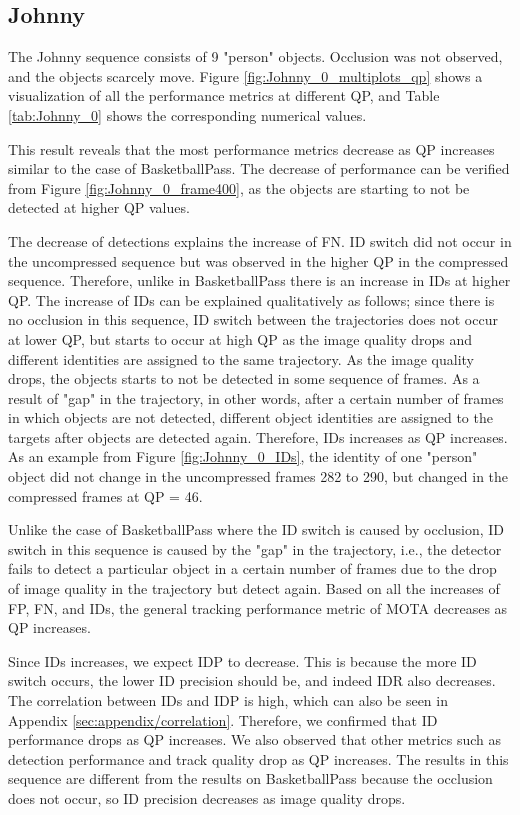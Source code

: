 \subsection{Johnny}
The Johnny sequence consists of 9 "person" objects. Occlusion was not observed, and the objects scarcely move. Figure \ref{fig:Johnny_0_multiplots_qp} shows a visualization of all the performance metrics at different QP, and Table \ref{tab:Johnny_0} shows the corresponding numerical values.


This result reveals that the most performance metrics decrease as QP increases similar to the case of BasketballPass. The decrease of performance can be verified from Figure \ref{fig:Johnny_0_frame400}, as the objects are starting to not be detected at higher QP values.

The decrease of detections explains the increase of FN. ID switch did not occur in the uncompressed sequence but was observed in the higher QP in the compressed sequence. Therefore, unlike in BasketballPass there is an increase in IDs at higher QP. The increase of IDs can be explained qualitatively as follows; since there is no occlusion in this sequence, ID switch between the trajectories does not occur at lower QP, but starts to occur at high QP as the image quality drops and different identities are assigned to the same trajectory. As the image quality drops, the objects starts to not be detected in some sequence of frames. As a result of "gap" in the trajectory, in other words, after a certain number of frames in which objects are not detected, different object identities are assigned to the targets after objects are detected again. Therefore, IDs increases as QP increases. As an example from Figure \ref{fig:Johnny_0_IDs}, the identity of one "person" object did not change in the uncompressed frames 282 to 290, but changed in the compressed frames at QP = 46.

Unlike the case of BasketballPass where the ID switch is caused by occlusion, ID switch in this sequence is caused by the "gap" in the trajectory, i.e., the detector fails to detect a particular object in a certain number of frames due to the drop of image quality in the trajectory but detect again. Based on all the increases of FP, FN, and IDs, the general tracking performance metric of MOTA decreases as QP increases.

Since IDs increases, we expect IDP to decrease. This is because the more ID switch occurs, the lower ID precision should be, and indeed IDR also decreases. The correlation between IDs and IDP is high, which can also be seen in Appendix \ref{sec:appendix/correlation}. Therefore, we confirmed that ID performance drops as QP increases. We also observed that other metrics such as detection performance and track quality drop as QP increases. The results in this sequence are different from the results on BasketballPass because the occlusion does not occur, so ID precision decreases as image quality drops.

